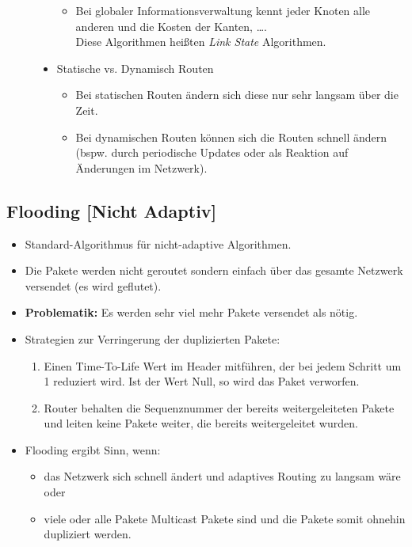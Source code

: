 \documentclass[a4paper, 11pt, accentcolor = tud3b]{tudreport}
\begin{document}
\begin{description}
\begin{itemize}
\begin{itemize}
			            			\item Bei globaler Informationsverwaltung kennt jeder Knoten alle anderen und die Kosten der Kanten, \dots. \\ Diese Algorithmen heißten \textit{Link State} Algorithmen.
			            		\end{itemize}
			            	\item Statische vs. Dynamisch Routen
				            	\begin{itemize}
				            		\item Bei statischen Routen ändern sich diese nur sehr langsam über die Zeit.
				            		\item Bei dynamischen Routen können sich die Routen schnell ändern (bspw. durch periodische Updates oder als Reaktion auf Änderungen im Netzwerk).
				            	\end{itemize}
		            	\end{itemize}
	            \end{description}
	        
	        \subsection{Flooding [Nicht Adaptiv]}
		        \begin{itemize}
		        	\item Standard-Algorithmus für nicht-adaptive Algorithmen.
		        	\item Die Pakete werden nicht geroutet sondern einfach über das gesamte Netzwerk versendet (es wird geflutet).
		        	\item \textbf{Problematik:} Es werden sehr viel mehr Pakete versendet als nötig.
		        	\item Strategien zur Verringerung der duplizierten Pakete:
		        	\begin{enumerate}
		        		\item Einen Time-To-Life Wert im Header mitführen, der bei jedem Schritt um 1 reduziert wird. Ist der Wert Null, so wird das Paket verworfen.
		        		\item Router behalten die Sequenznummer der bereits weitergeleiteten Pakete und leiten keine Pakete weiter, die bereits weitergeleitet wurden.
		        	\end{enumerate}
		        	\item Flooding ergibt Sinn, wenn:
		        	\begin{itemize}
		        		\item das Netzwerk sich schnell ändert und adaptives Routing zu langsam wäre oder
		        		\item viele oder alle Pakete Multicast Pakete sind und die Pakete somit ohnehin dupliziert werden.
		        	\end{itemize}
		        \end{itemize}
	        
\end{document}
